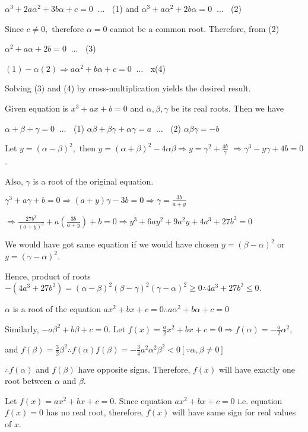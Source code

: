   $\alpha^3 + 2a\alpha^2 + 3b\alpha + c = 0\;\;\ldots\;\;$ (1) and $\alpha^3 + a\alpha^2 + 2b\alpha = 0\;\;\ldots\;\;$ (2)

  Since $c \ne 0,$ therefore $\alpha = 0$ cannot be a common root. Therefore, from (2)

  $\alpha^2 + a\alpha + 2b = 0\;\;\ldots\;\;$ (3)

  $(1) - \alpha (2) \Rightarrow a\alpha^2 + b\alpha + c = 0\;\;\ldots\;\;$ x(4)

  Solving (3) and (4) by cross-multiplication yields the desired result.
\item Given equation is $x^3 + ax + b = 0$ and $\alpha, \beta, \gamma$ be its real roots. Then we have

  $\alpha + \beta + \gamma = 0\;\;\ldots\;\;$ (1) $\alpha\beta + \beta\gamma + \alpha\gamma = a\;\;\ldots\;\;$ (2)
  $\alpha\beta\gamma = -b$

  Let $y = (\alpha - \beta)^2,$ then $y = (\alpha + \beta)^2 - 4\alpha\beta\Rightarrow y = \gamma^2 +
  \frac{4b}{\gamma}$ $\Rightarrow \gamma^3 - y\gamma + 4b = 0$.

  Also, $\gamma$ is a root of the original equation.

  $\gamma^3 + a\gamma + b = 0\Rightarrow (a + y)\gamma - 3b = 0 \Rightarrow \gamma = \frac{3b}{a + y}$

  $\Rightarrow \frac{27b^3}{(a + y)^3} + a\left(\frac{3b}{a + y}\right) + b = 0\Rightarrow y^3 + 6ay^2 +
  9a^2y + 4a^3 + 27b^2 = 0$

  We would have got same equation if we would have chosen $y = (\beta - \alpha)^2$ or $y = (\gamma - \alpha)^2$.

  Hence, product of roots $-(4a^3 + 27b^2) = (\alpha - \beta)^2(\beta - \gamma)^2(\gamma - \alpha)^2 \ge
  0\therefore 4a^3 + 27b^2 \le 0$.
\item $\alpha$ is a root of the equation $ax^2 + bx + c = 0\therefore a\alpha^2 + b\alpha + c = 0$

  Similarly, $-a\beta^2 + b\beta + c = 0$. Let $f(x) = \frac{a}{2}x^2 + bx + c = 0\Rightarrow f(\alpha) =
  -\frac{a}{2}\alpha^2$,

  and $f(\beta) = \frac{3}{2}\beta^2$$\therefore f(\alpha)f(\beta) = -\frac{3}{4}a^2\alpha^2\beta^2 < 0
  [\because \alpha,\beta \ne 0]$

  $\therefore f(\alpha)$ and $f(\beta)$ have opposite signs. Therefore, $f(x)$ will have exactly
  one root between $\alpha$ and $\beta$.
\item Let $f(x) = ax^2 + bx + c = 0$. Since equation $ax^2 + bx + c = 0$ i.e. equation $f(x) = 0$ has no
  real root, therefore, $f(x)$ will have same sign for real values of $x$.

